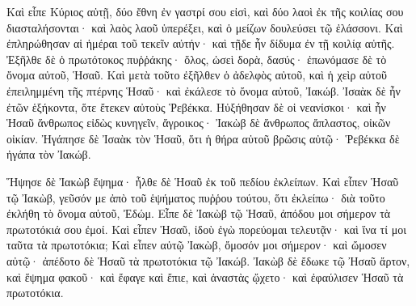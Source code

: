{Καὶ εἶπε Κύριος αὐτῇ, δύο ἔθνη ἐν γαστρί σου εἰσὶ, καὶ δύο λαοὶ ἐκ τῆς κοιλίας σου διασταλήσονται· καὶ λαὸς λαοῦ ὑπερέξει, καὶ ὁ μείζων δουλεύσει τῷ ἐλάσσονι.
Καὶ ἐπληρώθησαν αἱ ἡμέραι τοῦ τεκεῖν αὐτήν· καὶ τῇδε ἦν δίδυμα ἐν τῇ κοιλίᾳ αὐτῆς.
Ἐξῆλθε δὲ ὁ πρωτότοκος πυῤῥάκης· ὅλος, ὡσεὶ δορὰ, δασύς· ἐπωνόμασε δὲ τὸ ὄνομα αὐτοῦ, Ἡσαῦ.
Καὶ μετὰ τοῦτο ἐξῆλθεν ὁ ἀδελφὸς αὐτοῦ, καὶ ἡ χεὶρ αὐτοῦ ἐπειλημμένη τῆς πτέρνης Ἡσαῦ· καὶ ἐκάλεσε τὸ ὄνομα αὐτοῦ, Ἰακώβ. Ἰσαὰκ δὲ ἦν ἐτῶν ἑξήκοντα, ὅτε ἔτεκεν αὐτοὺς Ῥεβέκκα.
Ηὐξήθησαν δὲ οἱ νεανίσκοι· καὶ ἦν Ἡσαῦ ἄνθρωπος εἰδὼς κυνηγεῖν, ἄγροικος· Ἰακὼβ δὲ ἄνθρωπος ἄπλαστος, οἰκῶν οἰκίαν.
Ἠγάπησε δὲ Ἰσαὰκ τὸν Ἡσαῦ, ὅτι ἡ θήρα αὐτοῦ βρῶσις αὐτῷ· Ῥεβέκκα δὲ ἠγάπα τὸν Ἰακώβ.
\par }{\PP {}Ἥψησε δὲ Ἰακὼβ ἕψημα· ἦλθε δὲ Ἡσαῦ ἐκ τοῦ πεδίου ἐκλείπων.
Καὶ εἶπεν Ἡσαῦ τῷ Ἰακὼβ, γεῦσόν με ἀπὸ τοῦ ἑψήματος πυῤῥου τούτου, ὅτι ἐκλείπω· διὰ τοῦτο ἐκλήθη τὸ ὄνομα αὐτοῦ, Ἐδώμ.
Εἶπε δὲ Ἰακὼβ τῷ Ἡσαῦ, ἀπόδου μοι σήμερον τὰ πρωτοτόκιά σου ἐμοί.
Καὶ εἶπεν Ἡσαῦ, ἰδοὺ ἐγὼ πορεύομαι τελευτᾷν· καὶ ἵνα τί μοι ταῦτα τὰ πρωτοτόκια;
Καὶ εἶπεν αὐτῷ Ἰακὼβ, ὄμοσόν μοι σήμερον· καὶ ὤμοσεν αὐτῷ· ἀπέδοτο δὲ Ἡσαῦ τὰ πρωτοτόκια τῷ Ἰακώβ.
Ἰακὼβ δὲ ἔδωκε τῷ Ἠσαῦ ἄρτον, καὶ ἕψημα φακοῦ· καὶ ἔφαγε καὶ ἔπιε, καὶ ἀναστὰς ᾤχετο· καὶ ἐφαύλισεν Ἡσαῦ τὰ πρωτοτόκια.

}
